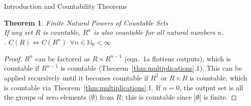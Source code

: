 \documentclass[12pt]{article}
\newtheorem{thm}{Theorem}
\begin{document}
\begin{section}{Introduction and Countability Theorems}
	\pagebreak\begin{thm}\label{thm:powers}
		\emph{
			Finite Natural Powers of Countable Sets\\
			\indent If any set $R$ is countable, $R^n$ is also countable for all natural
			numbers $n$.\vspace{0.4em}\\
			. $C(R)\iff C(R^n)~~\forall n\in\mathbb N_0<\infty$
		}
	\end{thm}\begin{proof}
		$R^n$ can be factored as $R\times R^{n-1}$ (eqn.~1a flattens outputs), which is countable if
		$R^{n-1}$ is countable (Theorem~\ref{thm:multiplications}.1). This can be applied recursively
		until it becomes countable if $R^2$ or $R\times R$ is countable, which is countable via
		Theorem~\ref{thm:multiplications}.1. If $n=0$, the output set is all the groups of zero
		elements ($\emptyset$) from $R$; this is countable since $\left|\emptyset\right|$ is finite.
	\end{proof}


\end{section}
\end{document}
